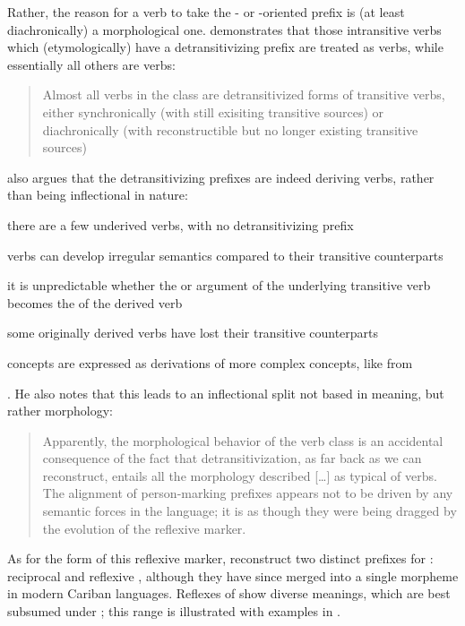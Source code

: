 Rather, the reason for a verb to take the - or -oriented prefix is (at least diachronically) a morphological one.
\textcite[217--221]{meira2000split} demonstrates that those intransitive verbs which (etymologically) have a detransitivizing prefix are treated as  verbs, while essentially all others are  verbs:
\begin{quotation}
Almost all verbs in the  class are detransitivized forms of transitive verbs, either synchronically (with still exisiting transitive sources) or diachronically (with reconstructible but no longer existing transitive sources) \parencite[201]{meira2000split}
\end{quotation}
\textcite[221--223]{meira2000split} also argues that the detransitivizing prefixes are indeed deriving  verbs, rather than being inflectional in nature:
\begin{inlinelist}
	\item there are a few underived  verbs, with no detransitivizing prefix
	\item {} verbs can develop irregular semantics compared to their transitive counterparts
	\item it is unpredictable whether the  or  argument of the underlying transitive verb becomes the  of the derived  verb
	\item some originally derived  verbs have lost their transitive counterparts
	\item {} concepts are expressed as derivations of more complex concepts, like  from 
\end{inlinelist}.
He also notes that this leads to an inflectional split not based in meaning, but rather morphology:

\begin{quotation}
Apparently, the morphological behavior of the  verb class is an accidental consequence of the fact that detransitivization, as far back as we can reconstruct, entails all the morphology described […] as typical of  verbs. The alignment of person-marking prefixes appears not to be driven by any semantic forces in the language; it is as though they were being dragged by the evolution of the reflexive marker. \parencite[226]{meira2000split}
\end{quotation}

As for the form of this reflexive marker, \textcite[505--512]{meira2010origin} reconstruct two distinct  prefixes for \PC: reciprocal  and reflexive , although they have since merged into a single morpheme in modern Cariban languages.
Reflexes of \detrz show diverse meanings, which are best subsumed under ; this range is illustrated with \trio examples in .


